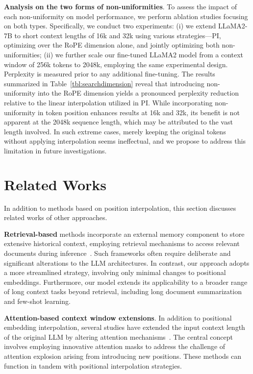 \textbf{Analysis on the two forms of non-uniformities}. To assess the impact of each non-uniformity on model performance, we perform ablation studies focusing on both types. Specifically, we conduct two experiments: (i) we extend LLaMA2-7B to short context lengths of 16k and 32k using various strategies—PI, optimizing over the RoPE dimension alone, and jointly optimizing both non-uniformities; (ii) we further scale our fine-tuned LLaMA2 model from a context window of 256k tokens to 2048k, employing the same experimental design. Perplexity is measured prior to any additional fine-tuning. The results summarized in Table~\ref{tbl:searchdimension} reveal that introducing non-uniformity into the RoPE dimension yields a pronounced perplexity reduction relative to the linear interpolation utilized in PI. While incorporating non-uniformity in token position enhances results at 16k and 32k, its benefit is not apparent at the 2048k sequence length, which may be attributed to the vast length involved. In such extreme cases, merely keeping the original tokens without applying interpolation seems ineffectual, and we propose to address this limitation in future investigations.

\section{Related Works}

In addition to methods based on position interpolation, this section discusses related works of other approaches. 

\textbf{Retrieval-based} methods incorporate an external memory component to store extensive historical context, employing retrieval mechanisms to access relevant documents during inference~\cite{longllama,wang2023augmenting,borgeaud2022improving}. Such frameworks often require deliberate and significant alterations to the LLM architectures. In contrast, our approach adopts a more streamlined strategy, involving only minimal changes to positional embeddings. Furthermore, our model extends its applicability to a broader range of long context tasks beyond retrieval, including long document summarization and few-shot learning.

\textbf{Attention-based context window extensions}. In addition to positional embedding interpolation, several studies have extended the input context length of the original LLM by altering attention mechanisms~\cite{han2023lminfinite, streamingllm,parallelwindow}. The central concept involves employing innovative attention masks to address the challenge of attention explosion arising from introducing new positions. These methods can function in tandem with positional interpolation strategies.

